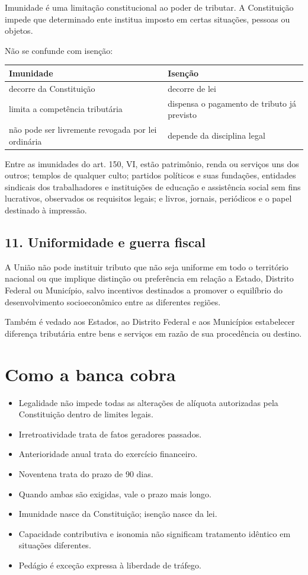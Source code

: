 \documentclass[11pt,a4paper]{article}
\begin{document}
Imunidade é uma limitação constitucional ao poder de tributar. A Constituição impede que determinado ente institua imposto em certas situações, pessoas ou objetos.

Não se confunde com isenção:

\begin{tabularx}{\linewidth}{lX}
\toprule
 \textbf{Imunidade} & \textbf{Isenção} \\
\midrule
 decorre da Constituição & decorre de lei \\
 limita a competência tributária & dispensa o pagamento de tributo já previsto \\
 não pode ser livremente revogada por lei ordinária & depende da disciplina legal \\
\bottomrule
\end{tabularx}


Entre as imunidades do art. 150, VI, estão patrimônio, renda ou serviços uns dos outros; templos de qualquer culto; partidos políticos e suas fundações, entidades sindicais dos trabalhadores e instituições de educação e assistência social sem fins lucrativos, observados os requisitos legais; e livros, jornais, periódicos e o papel destinado à impressão.

\subsection*{11. Uniformidade e guerra fiscal}

A União não pode instituir tributo que não seja uniforme em todo o território nacional ou que implique distinção ou preferência em relação a Estado, Distrito Federal ou Município, salvo incentivos destinados a promover o equilíbrio do desenvolvimento socioeconômico entre as diferentes regiões.

Também é vedado aos Estados, ao Distrito Federal e aos Municípios estabelecer diferença tributária entre bens e serviços em razão de sua procedência ou destino.

\section*{Como a banca cobra}

\begin{itemize}
  \item Legalidade não impede todas as alterações de alíquota autorizadas pela Constituição dentro de limites legais.
  \item Irretroatividade trata de fatos geradores passados.
  \item Anterioridade anual trata do exercício financeiro.
  \item Noventena trata do prazo de 90 dias.
  \item Quando ambas são exigidas, vale o prazo mais longo.
  \item Imunidade nasce da Constituição; isenção nasce da lei.
  \item Capacidade contributiva e isonomia não significam tratamento idêntico em situações diferentes.
  \item Pedágio é exceção expressa à liberdade de tráfego.
\end{itemize}
\end{document}
